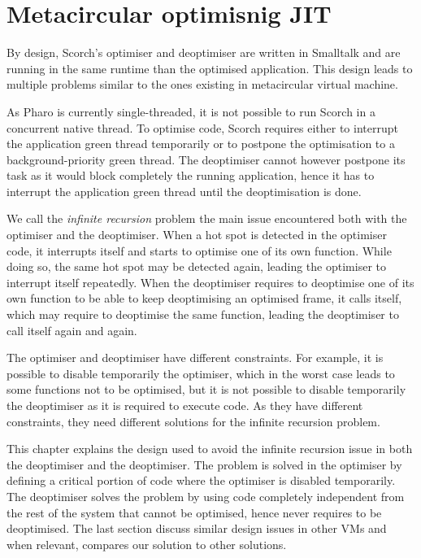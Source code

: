 \documentclass[a4paper,12pt,twoside]{../includes/ThesisStyle}
\begin{document}
\fi

\chapter{Metacircular optimisnig JIT}
\label{chap:metacircular}
\minitoc

By design, Scorch's optimiser and deoptimiser are written in Smalltalk and are running in the same runtime than the optimised application. This design leads to multiple problems similar to the ones existing in metacircular virtual machine. 

As Pharo is currently single-threaded, it is not possible to run Scorch in a concurrent native thread. To optimise code, Scorch requires either to interrupt the application green thread temporarily or to postpone the optimisation to a background-priority green thread. The deoptimiser cannot however postpone its task as it would block completely the running application, hence it has to interrupt the application green thread until the deoptimisation is done.

We call the \emph{infinite recursion} problem the main issue encountered both with the optimiser and the deoptimiser. When a hot spot is detected in the optimiser code, it interrupts itself and starts to optimise one of its own function. While doing so, the same hot spot may be detected again, leading the optimiser to interrupt itself repeatedly. When the deoptimiser requires to deoptimise one of its own function to be able to keep deoptimising an optimised frame, it calls itself, which may require to deoptimise the same function, leading the deoptimiser to call itself again and again.

The optimiser and deoptimiser have different constraints. For example, it is possible to disable temporarily the optimiser, which in the worst case leads to some functions not to be optimised, but it is not possible to disable temporarily the deoptimiser as it is required to execute code. As they have different constraints, they need different solutions for the infinite recursion problem.

This chapter explains the design used to avoid the infinite recursion issue in both the deoptimiser and the deoptimiser. The problem is solved in the optimiser by defining a critical portion of code where the optimiser is disabled temporarily. The deoptimiser solves the problem by using code completely independent from the rest of the system that cannot be optimised, hence never requires to be deoptimised. The last section discuss similar design issues in other VMs and when relevant, compares our solution to other solutions.
\end{document}
